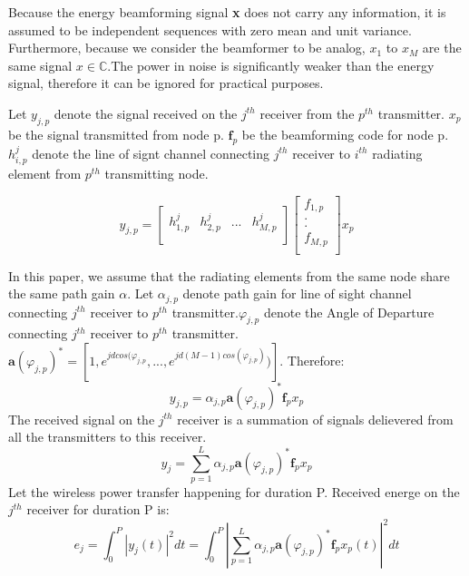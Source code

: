 \documentclass[journal]{IEEEtran}
\begin{document}
Because the energy beamforming signal \textbf{x} does not carry any information, it is assumed to be independent sequences with zero mean and unit variance. \cite{6884811} Furthermore, because we consider the beamformer to be analog, $x_1$ to $x_M$ are the same signal $x \in \mathbb{C}$.The power in noise is significantly weaker than the energy signal, therefore it can be ignored for practical purposes.

Let $y_{j,p}$ denote the signal received on the $j^{th}$ receiver from the $p^{th}$ transmitter. $x_p$ be the signal transmitted from node p. $\textbf{f}_p$ be the beamforming code for node p.  $h_{i,p}^j$ denote the line of signt channel connecting $j^{th}$ receiver to $i^{th}$ radiating element from $p^{th}$ transmitting node.

\[
y_{j,p}=
\begin{bmatrix}
h_{1,p}^j & h_{2,p}^j & ... & h_{M,p}^j\\
\end{bmatrix}
\begin{bmatrix}
f_{1,p}\\
.\\
.\\
f_{M,p}\\
\end{bmatrix}
x_p
\]



In this paper, we assume that the radiating elements from the same node share the same path gain $\alpha$. Let $\alpha_{j,p}$ denote path gain for line of sight channel connecting $j^{th}$ receiver to $p^{th}$ transmitter.$\varphi_{j,p}$ denote the Angle of Departure connecting $j^{th}$ receiver to $p^{th}$ transmitter. $\textbf{a}(\varphi_{j,p})^*=[1,e^{jdcos(\varphi_{j,p}},...,e^{jd(M-1)cos(\varphi_{j,p})})]$. Therefore:
\begin{equation}
y_{j,p}=\alpha_{j,p} \textbf{a}(\varphi_{j,p})^* \textbf{f}_p x_p
\end{equation}
The received signal on the $j^{th}$ receiver is a summation of signals delievered from all the transmitters to this receiver.
\begin{equation}
y_j=\sum_{p=1}^L \alpha_{j,p} \textbf{a}(\varphi_{j,p})^* \textbf{f}_p x_p
\end{equation}
Let the wireless power transfer happening for duration P. Received energe on the $j^{th}$ receiver for duration P is:
\begin{equation}
e_j=\int_0^P |y_j(t)|^2 dt=\int_0^P |\sum_{p=1}^L \alpha_{j,p} \textbf{a}(\varphi_{j,p})^* \textbf{f}_p x_p(t)|^2 dt
\end{equation}
\end{document}
